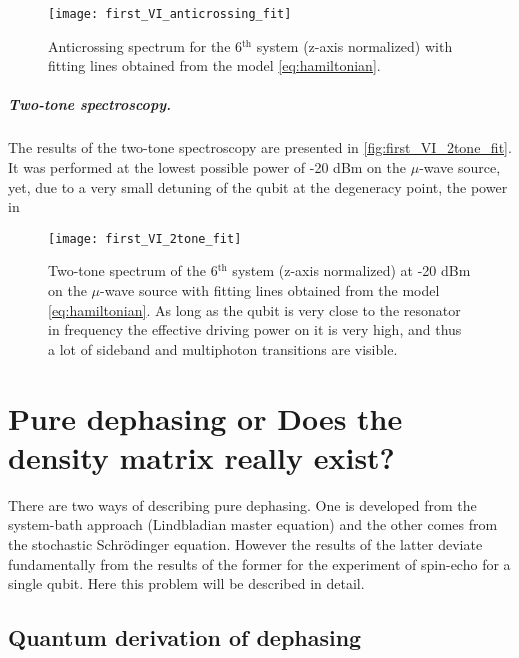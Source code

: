 \documentclass[12pt, twoside]{report}
\numberwithin{equation}{section}
\begin{document}
\begin{figure}
\centering
\texttt{[image: first\_VI\_anticrossing\_fit]}
\caption{Anticrossing spectrum for the 6$^\text{th}$ system (z-axis normalized) with fitting lines obtained from the model \eqref{eq:hamiltonian}. }
\label{fig:first_VI_anticrossing_fit}
\end{figure}

\paragraph{Two-tone spectroscopy.} The results of the two-tone spectroscopy are presented in \autoref{fig:first_VI_2tone_fit}. It was performed at the lowest possible power of -20 dBm on the $\mu$-wave source, yet, due to a very small detuning of the qubit at the degeneracy point, the power in

\begin{figure}
\centering
\texttt{[image: first\_VI\_2tone\_fit]}
\caption{Two-tone spectrum of the 6$^\text{th}$ system (z-axis normalized) at -20 dBm on the $\mu$-wave source with fitting lines obtained from the model \eqref{eq:hamiltonian}. As long as the qubit is very close to the resonator in frequency the effective driving power on it is very high, and thus a lot of sideband and multiphoton transitions are visible.}
\label{fig:first_VI_2tone_fit}
\end{figure}

\appendix

\chapter{Pure dephasing or Does the density matrix really exist?}

There are two ways of describing pure dephasing. One is developed from the system-bath approach (Lindbladian master equation) and the other comes from the stochastic Schrödinger equation. However the results of the latter deviate fundamentally from the results of the former for the experiment of spin-echo for a single qubit. Here this problem will be described in detail.

\section{Quantum derivation of dephasing}
\end{document}
